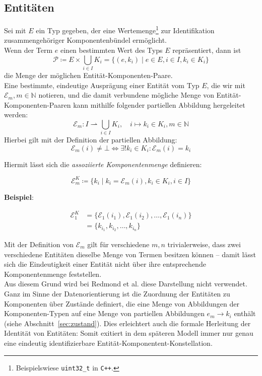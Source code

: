 \subsection{Entitäten}

Sei mit $E$ ein Typ gegeben, der eine Wertemenge\footnote{
    Beispielswiese \texttt{uint32\_t} in \texttt{C++}.
} zur Identifikation zusammengehöriger Komponentenbündel ermöglicht.\\

\noindent
Wenn der Term $e$ einen bestimmten Wert des Typs $E$ repräsentiert, dann ist
\[
    \mathcal{P} \coloneqq E \times \bigcup_{i \in I} K_i = \{(e, k_i) \mid e \in E, i \in I, k_i \in K_i\}
\]
die Menge der möglichen Entität-Komponenten-Paare.\\

\bigskip
Eine bestimmte, eindeutige Ausprägung einer Entität vom Typ $E$, die wir mit $\mathcal{E}_m, m \in \mathbb{N}$ notieren, und die damit verbundene mögliche Menge von Entität-Komponenten-Paaren kann mithilfe folgender partiellen Abbildung hergeleitet werden:
\[
    \mathcal{E}_m :  I \rightharpoonup \bigcup_{i \in I} K_i, \quad i \mapsto k_i \in K_i, m \in \mathbb{N}
\]
Hierbei gilt mit der Definition der partiellen Abbildung:
\[
    \mathcal{E}_m(i) \neq \bot \Leftrightarrow \exists{!} k_i \in K_i : \mathcal{E}_m(i) = k_i
\]

\noindent
Hiermit lässt sich die \textit{assoziierte Komponentenmenge} definieren:

\[
    \mathcal{E}^K_m \coloneqq \{k_i \mid k_i = \mathcal{E}_m(i), k_i \in K_i, i \in I \}
\]

\noindent
\textbf{Beispiel}:

\[
    \begin{alignat}{3}
        \mathcal{E}^K_{1} &= \{\mathcal{E}_{1}(i_1), \mathcal{E}_{1}(i_2), \ldots, \mathcal{E}_{1}(i_n)\}\\
        &= \{k_{i_1}, k_{i_2}, \ldots, k_{i_n}\}
    \end{alignat}
\]

\vspace{5mm}
\noindent
Mit der Definition von $\mathcal{E}_m$ gilt für verschiedene $m, n$ trivialerweise, dass zwei verschiedene Entitäten dieselbe Menge von Termen besitzen können -- damit lässt sich die Eindeutigkeit einer Entität nicht über ihre entsprechende Komponentenmenge feststellen.\\

Aus diesem Grund wird bei Redmond et al. diese Darstellung nicht verwendet.
Ganz im Sinne der Datenorientierung ist die Zuordnung der Entitäten zu Komponenten über Zustände definiert, die eine Menge von Abbildungen der Komponenten-Typen auf eine Menge von partiellen Abbildungen $e_m \rightarrow k_i$ enthält (siehe Abschnitt~\ref{sec:zustand}).
Dies erleichtert auch die formale Herleitung der Identität von Entitäten: Somit exitiert in dem späteren Modell immer nur genau eine eindeutig identifizierbare Entität-Komponentent-Konstellation.
\bigskip

